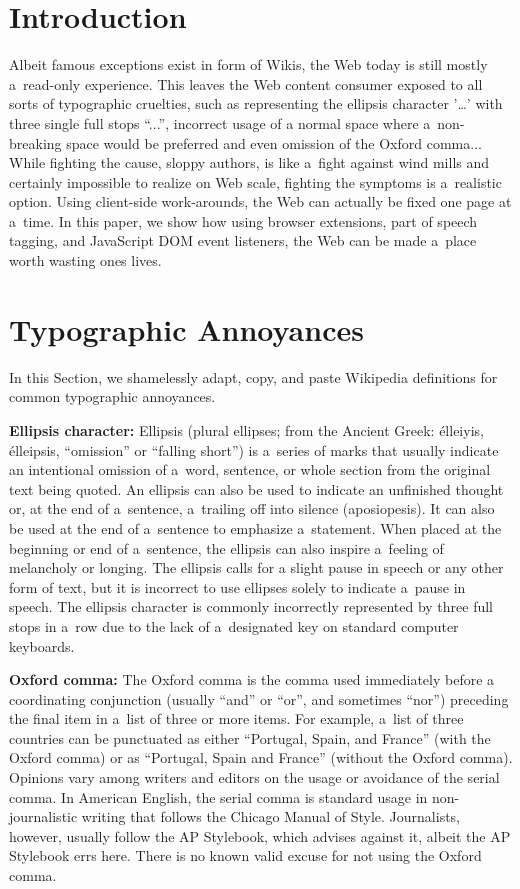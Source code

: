 \documentclass{acm_proc_article-sp}
\begin{document}

\section{Introduction}
Albeit famous exceptions exist in form of Wikis,
the Web today is still mostly a~read-only experience.
This leaves the Web content consumer exposed to all sorts of typographic cruelties,
such as representing the ellipsis character '\ldots' with three single full stops ``...'',
incorrect usage of a \linebreak %
normal space where a~non-breaking space would be preferred
and even omission of the Oxford comma...
While fighting the cause, sloppy authors, is like a~fight against wind mills
and certainly impossible to realize on Web scale,
fighting the symptoms is a~realistic option.
Using client-side work-arounds, the Web can actually be fixed one page at a~time.
In this paper, we show how using browser extensions, part of speech tagging,
and JavaScript DOM event listeners,
the Web can be made a~place worth wasting ones lives.

\section{Typographic Annoyances}
In this Section, we shamelessly adapt, copy,
and paste Wikipedia definitions for common typographic annoyances.

\textbf{Ellipsis character:} Ellipsis (plural ellipses; from the Ancient Greek:
\greektext élleiyis, %
\latintext élleipsis, ``omission'' or ``falling short'')
is a~series of marks that usually indicate an intentional omission of a~word,
sentence, or whole section from the original text being quoted.
An ellipsis can also be used to indicate an unfinished thought or,
at the end of a~sentence, a~trailing off into silence (aposiopesis).
It can also be used at the end of a~sentence to emphasize a~statement.
When placed at the beginning or end of a~sentence,
the ellipsis can also inspire a~feeling of melancholy or longing.
The ellipsis calls for a slight pause in speech or any other form of text,
but it is incorrect to use ellipses solely to indicate a~pause in speech.
The ellipsis character is commonly incorrectly represented
by three full stops in a~row due to the lack of a~designated key on standard computer keyboards.

\textbf{Oxford comma:} The Oxford comma is the comma used immediately before a coordinating conjunction (usually ``and'' or ``or'',
and sometimes ``nor'') preceding the final item in a~list of three or more items.
For example, a~list of three countries can be punctuated as either
``Portugal, Spain, and France'' (with the Oxford comma) or as
``Portugal, Spain and France'' (without the Oxford comma).
Opinions vary among writers and editors on the usage or avoidance of the serial comma.
In American English, the serial comma is standard usage in non-journalistic writing that follows the Chicago Manual of Style.
Journalists, however, usually follow the AP Stylebook, which advises against it,
albeit the AP Stylebook errs here.
There is no known valid excuse for not using the Oxford comma.
\end{document}
